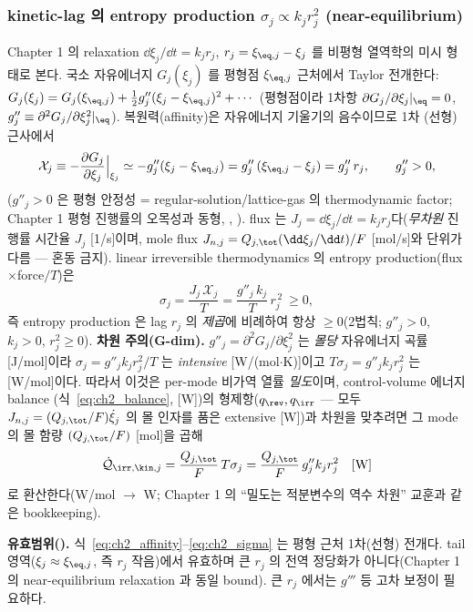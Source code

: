 \subsubsection{kinetic-lag 의 entropy production $\sigma_j\propto k_j r_j^2$ (near-equilibrium)}\label{sec:ch2_sigma}
Chapter 1 의 relaxation $\dd\xi_j/\dd t=k_j r_j$, $r_j=\xi_{\eq,j}-\xi_j$ 를 비평형 열역학의 미시 형태로 본다.
국소 자유에너지 $G_j(\xi_j)$ 를 평형점 $\xi_{\eq,j}$ 근처에서 Taylor 전개한다: $G_j(\xi_j)=G_j(\xi_{\eq,j})
+\tfrac12 g''_j(\xi_j-\xi_{\eq,j})^2+\cdots$ (평형점이라 1차항 $\partial G_j/\partial\xi_j|_{\eq}=0$,
$g''_j\equiv\partial^2 G_j/\partial\xi_j^2|_{\eq}$). 복원력(affinity)은 자유에너지 기울기의 음수이므로 1차
(선형) 근사에서
\begin{equation}
\mathcal X_j\equiv-\frac{\partial G_j}{\partial\xi_j}\Big|_{\xi_j}\simeq -g''_j(\xi_j-\xi_{\eq,j})=g''_j\,(\xi_{\eq,j}-\xi_j)=g''_j\,r_j,
\qquad g''_j>0,
\label{eq:ch2_affinity}
\end{equation}
($g''_j>0$ 은 평형 안정성 = regular-solution/lattice-gas 의 thermodynamic factor; Chapter 1 평형 진행률의
오목성과 동형, \cite{bazant2013}, ). flux 는 $J_j=\dd\xi_j/\dd t=k_j r_j$다(\emph{무차원} 진행률
시간율 $J_j$ [1/s]이며, mole flux $J_{n,j}=Q_{j,\tot}(\dd\xi_j/\dd t)/F$ [mol/s]와 단위가 다름 — 혼동 금지). linear irreversible
thermodynamics 의 entropy production(flux$\times$force$/T$)은 \cite{degrootmazur1962,onsager1931}
\begin{equation}
\boxed{\;\sigma_j=\frac{J_j\,\mathcal X_j}{T}=\frac{g''_j\,k_j}{T}\,r_j^{\,2}\ \ge 0,\;}
\label{eq:ch2_sigma}
\end{equation}
즉 entropy production 은 lag $r_j$ 의 \emph{제곱}에 비례하여 항상 $\ge0$(2법칙; $g''_j>0$, $k_j>0$,
$r_j^2\ge0$). \textbf{차원 주의(G-dim).} $g''_j=\partial^2 G_j/\partial\xi_j^2$ 는 \emph{몰당} 자유에너지 곡률
[J/mol]이라 $\sigma_j=g''_j k_j r_j^2/T$ 는 \emph{intensive} [W/(mol$\cdot$K)]이고 $T\sigma_j=g''_j k_j r_j^2$
는 [W/mol]이다. 따라서 이것은 per-mode 비가역 열률 \emph{밀도}이며, control-volume 에너지 balance
(식~\eqref{eq:ch2_balance}, [W])의 형제항($q_\rev,q_\irr$ — 모두 $J_{n,j}=(Q_{j,\tot}/F)\dot\xi_j$ 의 몰 인자를
품은 extensive [W])과 차원을 맞추려면 그 mode 의 몰 함량 $(Q_{j,\tot}/F)$ [mol]을 곱해
\begin{equation}
\dot{\mathcal Q}_{\irr,\kin,j}=\frac{Q_{j,\tot}}{F}\,T\sigma_j=\frac{Q_{j,\tot}}{F}\,g''_j k_j r_j^2\quad[\mathrm W]
\label{eq:ch2_qirrkin_ext}
\end{equation}
로 환산한다(W/mol $\to$ W; Chapter 1 의 ``밀도는 적분변수의 역수 차원'' 교훈과 같은 bookkeeping).
\begin{boundbox}
\textbf{유효범위().} 식~\eqref{eq:ch2_affinity}--\eqref{eq:ch2_sigma} 는 평형 근처 1차(선형) 전개다.
tail 영역($\xi_j\approx\xi_{\eq,j}$, 즉 $r_j$ 작음)에서 유효하며 큰 $r_j$ 의 전역 정당화가 아니다(Chapter 1
의 near-equilibrium relaxation 과 동일 bound). 큰 $r_j$ 에서는 $g'''$ 등 고차 보정이 필요하다.
\end{boundbox}

